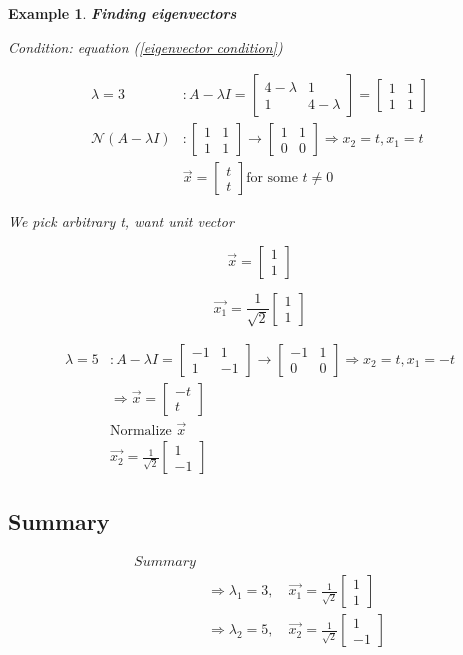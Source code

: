 \documentclass[12pt]{amsart}
\newtheorem{example}{Example}      %
\numberwithin{equation}{theorem}    %
\newcommand{\drawvec}[1]{                    %
    \begin{bmatrix}
        #1
    \end{bmatrix}
}
\begin{document}
\begin{example}\textbf{Finding eigenvectors}

Condition: equation (\ref{eigenvector condition})

\begin{align*}
    \lambda = 3              & : A-\lambda I = \begin{bmatrix}
        4 - \lambda & 1           \\
        1           & 4 - \lambda
    \end{bmatrix} = \drawvec{1 & 1 \\ 1 & 1} \\
    \mathcal{N}(A-\lambda I) & : \drawvec{1                                            & 1 \\ 1 & 1} \rightarrow \drawvec{ 1 & 1\\ 0 & 0} \Rightarrow x_2 = t, x_1=t \\
                             & \vec{x} = \drawvec{t                                        \\ t} \text{for some } t \ne 0
\end{align*}

We pick arbitrary t, want unit vector

$$\vec{x} = \drawvec{1 \\ 1}$$

$$\boxed{\vec{x_1} = \frac{1}{\sqrt{2}} \drawvec{1 \\ 1}}$$

\begin{align*}
    \lambda = 5 & : A-\lambda I = \drawvec{-1               & 1 \\ 1 & -1} \rightarrow \drawvec{-1 & 1 \\ 0 & 0} \Rightarrow x_2 = t, x_1 = -t \\
                & \Rightarrow \vec{x} = \drawvec{-t             \\ t} \\
                & \text{Normalize } \vec{x}                     \\
                & \boxed{\vec{x_2} = \frac{1}{\sqrt{2}} \drawvec{1 \\ -1}}
\end{align*}
\end{example}

\subsection{Summary}

\begin{align*}
    Summary &                                                                            \\
            & \Rightarrow \lambda_1 = 3, \quad \vec{x_1} = \frac{1}{\sqrt{2}} \drawvec{1 \\ 1} \\
            & \Rightarrow \lambda_2 = 5, \quad \vec{x_2} = \frac{1}{\sqrt2}\drawvec{1    \\ -1}
\end{align*}
\end{document}
